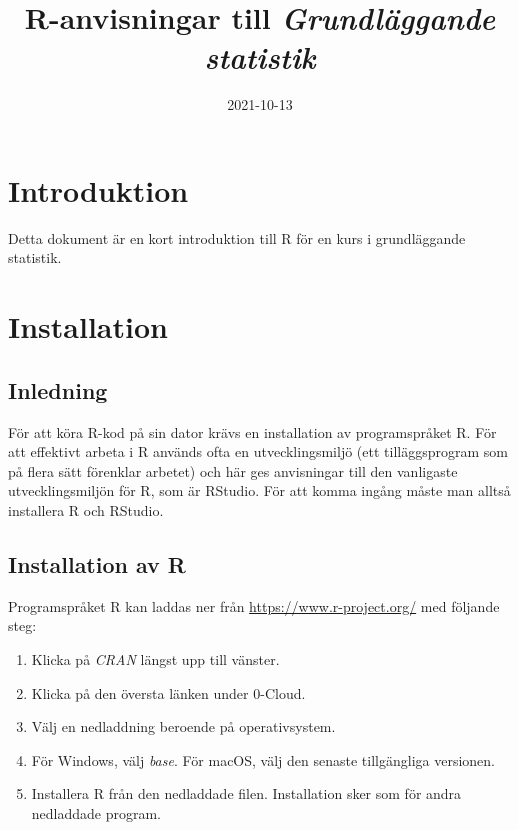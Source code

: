 \documentclass[
]{book}
\title{R-anvisningar till \emph{Grundläggande statistik}}
\author{}
\date{\vspace{-2.5em}2021-10-13}
\providecommand{\tightlist}{%
  \setlength{\itemsep}{0pt}\setlength{\parskip}{0pt}}
\theoremstyle{definition}
\theoremstyle{definition}
\theoremstyle{definition}
\theoremstyle{definition}
\theoremstyle{remark}
\begin{document}
\maketitle

{
\setcounter{tocdepth}{1}
\tableofcontents
}
\hypertarget{introduktion}{%
\chapter{Introduktion}\label{introduktion}}

Detta dokument är en kort introduktion till R för en kurs i grundläggande statistik.

\hypertarget{installation}{%
\chapter{Installation}\label{installation}}

\hypertarget{inledning}{%
\section{Inledning}\label{inledning}}

För att köra R-kod på sin dator krävs en installation av programspråket R. För att effektivt arbeta i R används ofta en utvecklingsmiljö (ett tilläggsprogram som på flera sätt förenklar arbetet) och här ges anvisningar till den vanligaste utvecklingsmiljön för R, som är RStudio. För att komma ingång måste man alltså installera R och RStudio.

\hypertarget{installation-av-r}{%
\section{Installation av R}\label{installation-av-r}}

Programspråket R kan laddas ner från \url{https://www.r-project.org/} med följande steg:

\begin{enumerate}
\def\labelenumi{\arabic{enumi}.}
\tightlist
\item
  Klicka på \emph{CRAN} längst upp till vänster.
\item
  Klicka på den översta länken under 0-Cloud.
\item
  Välj en nedladdning beroende på operativsystem.
\item
  För Windows, välj \emph{base}. För macOS, välj den senaste tillgängliga versionen.
\item
  Installera R från den nedladdade filen. Installation sker som för andra nedladdade program.
\end{enumerate}
\end{document}
